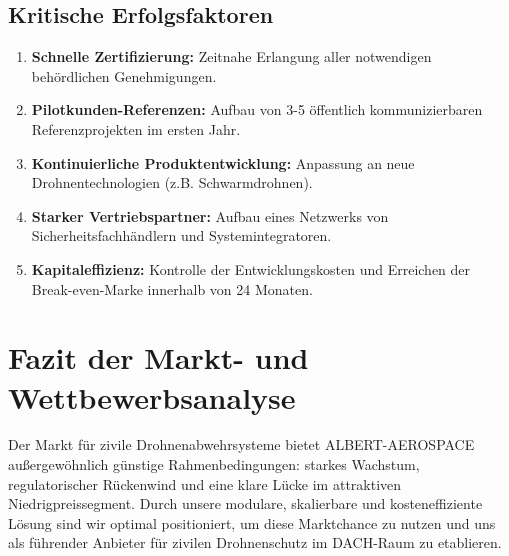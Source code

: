\documentclass[11pt,a4paper]{article}
\begin{document}
\subsection{Kritische Erfolgsfaktoren}
\begin{enumerate}
    \item \textbf{Schnelle Zertifizierung:} Zeitnahe Erlangung aller notwendigen behördlichen Genehmigungen.
    \item \textbf{Pilotkunden-Referenzen:} Aufbau von 3-5 öffentlich kommunizierbaren Referenzprojekten im ersten Jahr.
    \item \textbf{Kontinuierliche Produktentwicklung:} Anpassung an neue Drohnentechnologien (z.B. Schwarmdrohnen).
    \item \textbf{Starker Vertriebspartner:} Aufbau eines Netzwerks von Sicherheitsfachhändlern und Systemintegratoren.
    \item \textbf{Kapitaleffizienz:} Kontrolle der Entwicklungskosten und Erreichen der Break-even-Marke innerhalb von 24 Monaten.
\end{enumerate}

\section*{Fazit der Markt- und Wettbewerbsanalyse}
Der Markt für zivile Drohnenabwehrsysteme bietet ALBERT-AEROSPACE außergewöhnlich günstige Rahmenbedingungen: starkes Wachstum, regulatorischer Rückenwind und eine klare Lücke im attraktiven Niedrigpreissegment. Durch unsere modulare, skalierbare und kosteneffiziente Lösung sind wir optimal positioniert, um diese Marktchance zu nutzen und uns als führender Anbieter für zivilen Drohnenschutz im DACH-Raum zu etablieren.
\end{document}
